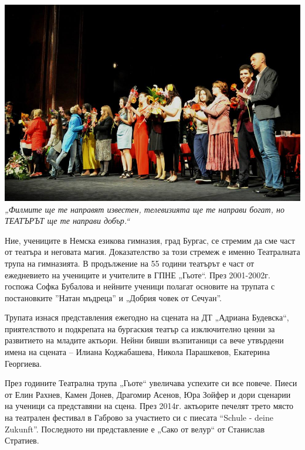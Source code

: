 
\begin{center}
\includegraphics[width=6.2in]{./Teatar/1.jpg}\\
\textit{„Филмите ще те направят известен, телевизията ще те направи богат, но ТЕАТЪРЪТ ще те направи добър.``}
\end{center}

Ние, учениците в Немска езикова гимназия, град Бургас, се стремим да сме част от театъра и неговата магия. Доказателство за този стремеж е именно Театралната трупа на гимназията. В продължение на 55 години театърът е част от ежедневието на учениците и учителите в ГПНЕ „Гьоте“. През 2001-2002г. госпожа Софка Бубалова и нейните ученици полагат основите на трупата с постановките ”Натан мъдреца” и „Добрия човек от Сечуан”. 

Трупата изнася представления ежегодно на сцената на ДТ „Адриана Будевска“, приятелството и подкрепата на бургаския театър са изключително ценни за развитието на младите актьори. Нейни бивши възпитаници са  вече утвърдени имена на сцената – Илиана Коджабашева, Никола Парашкевов, Екатерина Георгиева.

През годините Театрална трупа „Гьоте“ увеличава успехите си все повече. Пиеси от Елин Рахнев,  Камен Донев, Драгомир Асенов, Юра Зойфер и дори сценарии на ученици са представяни на сцена. През 2014г. актьорите печелят трето място на театрален фестивал в Габрово за участието си с пиесата “Schule - deine Zukunft”. Последното ни представление е „Сако от велур“ от Станислав Стратиев.

